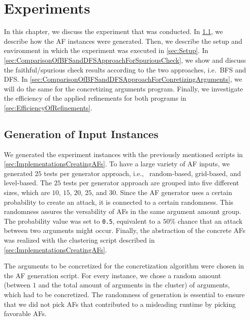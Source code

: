 \chapter{Experiments}
\label{ch:experiment}
In this chapter, we discuss the experiment that was conducted. In \cref{sec:GenerationOfInputInstances}, we describe how the AF instances were generated. Then, we describe the setup and environment in which the experiment was executed in \cref{sec:Setup}. In \cref{sec:ComparisonOfBFSandDFSApproachForSpuriousCheck}, we show and discuss the faithful/spurious check results according to the two approaches, i.e.\ BFS and DFS. In \cref{sec:ComparisonOfBFSandDFSApproachForConretizingArguments}, we will do the same for the concretizing arguments program. Finally, we investigate the efficiency of the applied refinements for both programs in \cref{sec:EfficiencyOfRefinements}.


\section{Generation of Input Instances}
\label{sec:GenerationOfInputInstances}
We generated the experiment instances with the previously mentioned scripts in \cref{sec:ImplementationsCreatingAFs}. To have a large variety of AF inputs, we generated $25$ tests per generator approach, i.e., \ random-based, grid-based, and level-based. The $25$ tests per generator approach are grouped into five different sizes, which are $10$, $15$, $20$, $25$, and $30$. Since the AF generator uses a certain probability to create an attack, it is connected to a certain randomness. This randomness assures the versability of AFs in the same argument amount group. The probability value was set to \texttt{0.5}, equivalent to a $50\%$ chance that an attack between two arguments might occur. Finally, the abstraction of the concrete AFs was realized with the clustering script described in \cref{sec:ImplementationsCreatingAFs}. 

The arguments to be concretized for the concretization algorithm were chosen in the AF generation script. For every instance, we chose a random amount (between $1$ and the total amount of arguments in the cluster) of arguments, which had to be concretized. The randomness of generation is essential to ensure that we did not pick AFs that contributed to a misleading runtime by picking favorable AFs.


